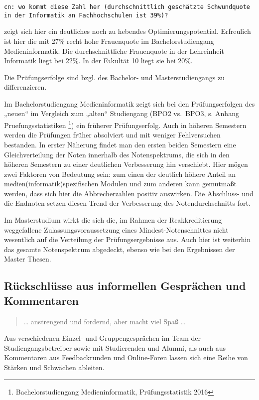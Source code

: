 \begin{verbatim}
cn: wo kommt diese Zahl her (durchschnittlich geschätzte Schwundquote in der Informatik an Fachhochschulen ist 39%)?
\end{verbatim}

zeigt sich hier ein deutliches noch zu hebendes Optimierungspotential.
Erfreulich ist hier die mit 27\% recht hohe Frauenquote im
Bachelorstudiengang Medieninformatik. Die durchschnittliche Frauenquote
in der Lehreinheit Informatik liegt bei 22\%. In der Fakultät 10 liegt
sie bei 20\%.

Die Prüfungserfolge sind bzgl. des Bachelor- und Masterstudiengangs zu
differenzieren.

Im Bachelorstudiengang Medieninformatik zeigt sich bei den
Prüfungserfolgen des „neuen`` im Vergleich zum „alten`` Studiengang
(BPO2 vs.~BPO3, s. Anhang Pruefungsstatistiken \footnote{Bachelorstudiengang
  Medieninformatik, Prüfungsstatistik 2016}) ein früherer
Prüfungserfolg. Auch in höheren Semestern werden die Prüfungen früher
absolviert und mit weniger Fehlversuchen bestanden. In erster Näherung
findet man den ersten beiden Semestern eine Gleichverteilung der Noten
innerhalb des Notenspektrums, die sich in den höheren Semestern zu einer
deutlichen Verbesserung hin verschiebt. Hier mögen zwei Faktoren von
Bedeutung sein: zum einen der deutlich höhere Anteil an
medien(informatik)spezifischen Modulen und zum anderen kann gemutmaßt
werden, dass sich hier die Abbrecherzahlen positiv auswirken. Die
Abschluss- und die Endnoten setzen diesen Trend der Verbesserung des
Notendurchschnitts fort.

Im Masterstudium wirkt die sich die, im Rahmen der Reakkreditierung
weggefallene Zulassungsvoraussetzung eines Mindest-Notenschnittes nicht
wesentlich auf die Verteilung der Prüfungsergebnisse aus. Auch hier ist
weiterhin das gesamte Notenspektrum abgedeckt, ebenso wie bei den
Ergebnissen der Master Thesen.

\subsection{Rückschlüsse aus informellen Gesprächen und
Kommentaren}\label{ruxfcckschluxfcsse-aus-informellen-gespruxe4chen-und-kommentaren}

\begin{quote}
\ldots{} anstrengend und fordernd, aber macht viel Spaß \ldots{}
\end{quote}

Aus verschiedenen Einzel- und Gruppengesprächen im Team der
Studiengangsbetreiber sowie mit Studierenden und Alumni, als auch aus
Kommentaren aus Feedbackrunden und Online-Foren lassen sich eine Reihe
von Stärken und Schwächen ableiten.

